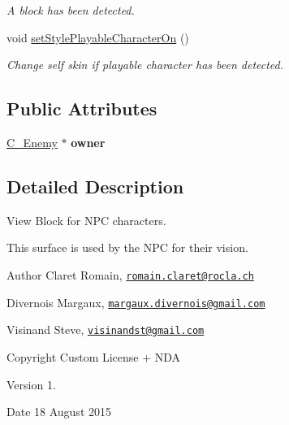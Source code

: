 \begin{DoxyCompactItemize}
\begin{DoxyCompactList}\small\item\em A block has been detected. \end{DoxyCompactList}\item 
\hypertarget{class_s___view_block_n_p_c_a8b5b1c08526115e555f49c292fabb59f}{}void \hyperlink{class_s___view_block_n_p_c_a8b5b1c08526115e555f49c292fabb59f}{set\+Style\+Playable\+Character\+On} ()\label{class_s___view_block_n_p_c_a8b5b1c08526115e555f49c292fabb59f}

\begin{DoxyCompactList}\small\item\em Change self skin if playable character has been detected. \end{DoxyCompactList}\end{DoxyCompactItemize}
\subsection*{Public Attributes}
\begin{DoxyCompactItemize}
\item 
\hypertarget{class_s___view_block_n_p_c_a1e212dd605da3a0a20ed8bce81ea5c70}{}\hyperlink{class_c___enemy}{C\+\_\+\+Enemy} $\ast$ {\bfseries owner}\label{class_s___view_block_n_p_c_a1e212dd605da3a0a20ed8bce81ea5c70}

\end{DoxyCompactItemize}


\subsection{Detailed Description}
View Block for N\+P\+C characters. 

This surface is used by the N\+P\+C for their vision. \begin{DoxyAuthor}{Author}
Claret Romain, \href{mailto:romain.claret@rocla.ch}{\tt romain.\+claret@rocla.\+ch} 

Divernois Margaux, \href{mailto:margaux.divernois@gmail.com}{\tt margaux.\+divernois@gmail.\+com} 

Visinand Steve, \href{mailto:visinandst@gmail.com}{\tt visinandst@gmail.\+com} 
\end{DoxyAuthor}
\begin{DoxyCopyright}{Copyright}
Custom License + N\+D\+A 
\end{DoxyCopyright}
\begin{DoxyVersion}{Version}
1. 
\end{DoxyVersion}
\begin{DoxyDate}{Date}
18 August 2015 
\end{DoxyDate}


